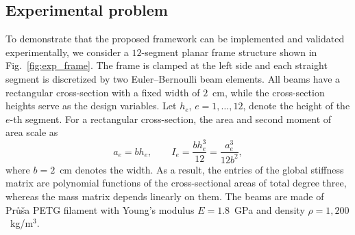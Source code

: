 \documentclass[preprint,3p]{elsarticle}
\numberwithin{equation}{section}
\begin{document}
\subsection{Experimental problem}

To demonstrate that the proposed framework can be implemented and validated experimentally, we consider a $12$-segment planar frame structure shown in Fig.~\ref{fig:exp_frame}. The frame is clamped at the left side and each straight segment is discretized by two Euler--Bernoulli beam elements. All beams have a rectangular cross-section with a fixed width of $2$~cm, while the cross-section heights serve as the design variables. Let $h_e$, $e=1,\dots,12$, denote the height of the $e$-th segment. For a rectangular cross-section, the area and second moment of area scale as
\[
a_e = b h_e, 
\qquad 
I_e = \frac{b h_e^3}{12} = \frac{a_e^3}{12 b^2},
\]
where $b=2$~cm denotes the width. As a result, the entries of the global stiffness matrix are polynomial functions of the cross-sectional areas of total degree three, whereas the mass matrix depends linearly on them. The beams are made of Pr\r{u}\v{s}a PETG filament with Young's modulus $E = 1.8$~GPa and density $\rho = 1{,}200$~kg/m$^3$.
\end{document}
